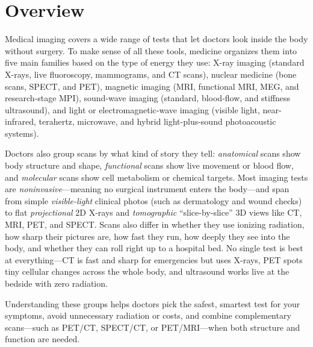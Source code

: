 \label{ch:infographic-imaging-classification}

\section{Overview}

Medical imaging covers a wide range of tests that let doctors look inside the body without surgery. To make sense of all these tools, medicine organizes them into five main families based on the type of energy they use: X-ray imaging (standard X-rays, live fluoroscopy, mammograms, and CT scans), nuclear medicine (bone scans, SPECT, and PET), magnetic imaging (MRI, functional MRI, MEG, and research-stage MPI), sound-wave imaging (standard, blood-flow, and stiffness ultrasound), and light or electromagnetic-wave imaging (visible light, near-infrared, terahertz, microwave, and hybrid light-plus-sound photoacoustic systems).

Doctors also group scans by what kind of story they tell: \emph{anatomical} scans show body structure and shape, \emph{functional} scans show live movement or blood flow, and \emph{molecular} scans show cell metabolism or chemical targets. Most imaging tests are \emph{noninvasive}---meaning no surgical instrument enters the body---and span from simple \emph{visible-light} clinical photos (such as dermatology and wound checks) to flat \emph{projectional} 2D X-rays and \emph{tomographic} ``slice-by-slice'' 3D views like CT, MRI, PET, and SPECT. Scans also differ in whether they use ionizing radiation, how sharp their pictures are, how fast they run, how deeply they see into the body, and whether they can roll right up to a hospital bed. No single test is best at everything---CT is fast and sharp for emergencies but uses X-rays, PET spots tiny cellular changes across the whole body, and ultrasound works live at the bedside with zero radiation.

Understanding these groups helps doctors pick the safest, smartest test for your symptoms, avoid unnecessary radiation or costs, and combine complementary scans---such as PET/CT, SPECT/CT, or PET/MRI---when both structure and function are needed.

